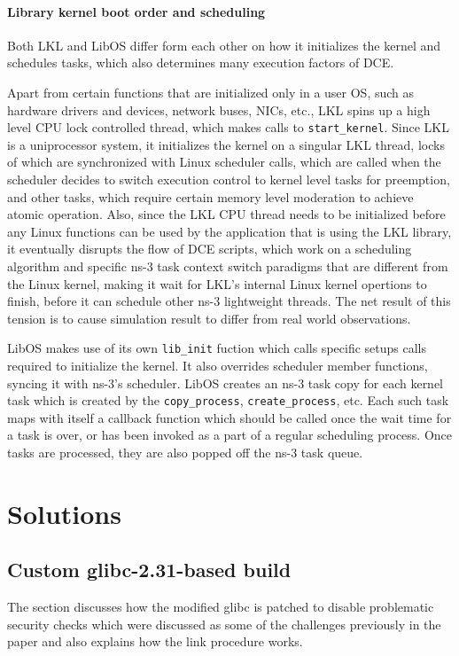 \documentclass{sig-alternate}
\begin{document}
\paragraph{Library kernel boot order and scheduling}
Both LKL and LibOS differ form each other on how it initializes the kernel and schedules tasks, which also determines many execution factors of DCE. 

Apart from certain functions that are initialized only in a user OS, such as hardware drivers and devices, network buses, NICs, etc., LKL spins up a high level CPU lock controlled thread, which makes calls to 
\texttt{start\_kernel}. Since LKL is a uniprocessor system, it initializes the kernel on a singular LKL thread, locks of 
which are synchronized with Linux scheduler calls, which are called when the scheduler decides to switch execution control 
to kernel level tasks for preemption, and other tasks, which require certain memory level moderation to achieve
atomic operation. Also, since the LKL CPU thread needs to be initialized before any Linux functions can be used by the 
application that is using the LKL library, it eventually disrupts the flow of DCE scripts, which work on a 
scheduling algorithm and specific ns-3 task context switch paradigms that are different from the Linux kernel,
making it wait for LKL's internal Linux kernel opertions to finish, before it can schedule other ns-3 lightweight
threads.  The net result of this tension is to cause simulation result to differ from real world observations.

LibOS makes 
use of its own \texttt{lib\_init} fuction which calls specific setups calls required to initialize the kernel.
It also overrides scheduler member functions, syncing it with ns-3's 
scheduler. LibOS creates an ns-3 task copy for each kernel task which is created by the \texttt{copy\_process}, \texttt{create\_process},
etc. Each such task maps with itself a callback function which should be called once the wait time
for a task is over, or has been invoked as a part of a regular scheduling process. Once tasks are processed, they are 
also popped off the ns-3 task queue.

\section{Solutions}
\label{section:design}

\subsection{Custom glibc-2.31-based build}
The section discusses how the modified glibc is patched to disable problematic security checks which were discussed as some of the challenges previously
in the paper and also explains how the link procedure works.
\end{document}
